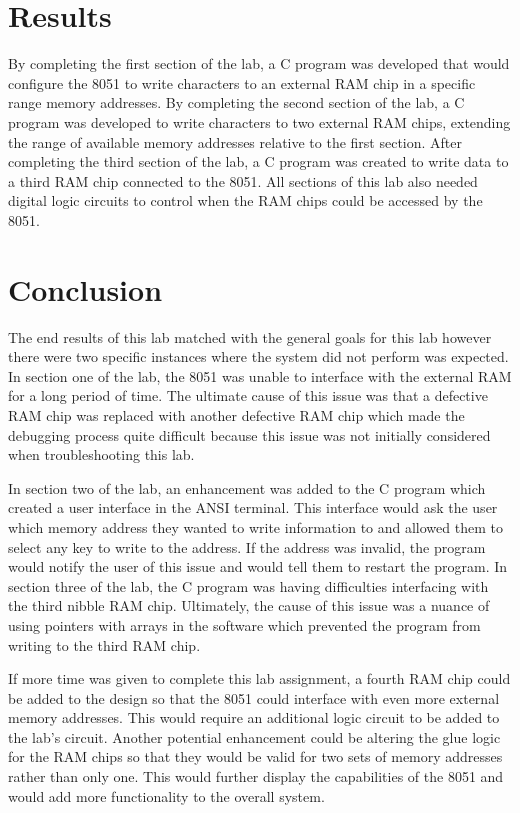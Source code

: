 \documentclass[12pt]{article}
\begin{document}
\section{Results}
By completing the first section of the lab, a C program was developed that would configure the 8051 to write characters to an external RAM chip in a specific range memory addresses. By completing the second section of the lab, a C program was developed to write characters to two external RAM chips, extending the range of available memory addresses relative to the first section. After completing the third section of the lab, a C program was created to write data to a third RAM chip connected to the 8051. All sections of this lab also needed digital logic circuits to control when the RAM chips could be accessed by the 8051. 


\section{Conclusion}
The end results of this lab matched with the general goals for this lab however there were two specific instances where the system did not perform was expected. In section one of the lab, the 8051 was unable to interface with the external RAM for a long period of time. The ultimate cause of this issue was that a defective RAM chip was replaced with another defective RAM chip which made the debugging process quite difficult because this issue was not initially considered when troubleshooting this lab. 

In section two of the lab, an enhancement was added to the C program which created a user interface in the ANSI terminal. This interface would ask the user which memory address they wanted to write information to and allowed them to select any key to write to the address. If the address was invalid, the program would notify the user of this issue and would tell them to restart the program. In section three of the lab, the C program was having difficulties interfacing with the third nibble RAM chip. Ultimately, the cause of this issue was a nuance of using pointers with arrays in the software which prevented the program from writing to the third RAM chip. 

If more time was given to complete this lab assignment, a fourth RAM chip could be added to the design so that the 8051 could interface with even more external memory addresses. This would require an additional logic circuit to be added to the lab’s circuit. Another potential enhancement could be altering the glue logic for the RAM chips so that they would be valid for two sets of memory addresses rather than only one. This would further display the capabilities of the 8051 and would add more functionality to the overall system. 
\end{document}
